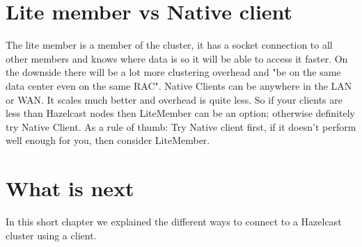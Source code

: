 \section{Lite member vs Native client}
The lite member is a member of the cluster, it has a socket connection to all other members and knows where data is so it will be able to access it faster. On the downside there will be a lot more clustering overhead and "be on the same data center even on the same RAC". Native Clients can be anywhere in the LAN or WAN. It scales much better and overhead is quite less. So if your clients are less than Hazelcast nodes then LiteMember can be an option; otherwise definitely try Native Client. As a rule of thumb: Try Native client first, if it doesn't perform well enough for you, then consider LiteMember.

\section{What is next}
In this short chapter we explained the different ways to connect to a Hazelcast cluster using a client.